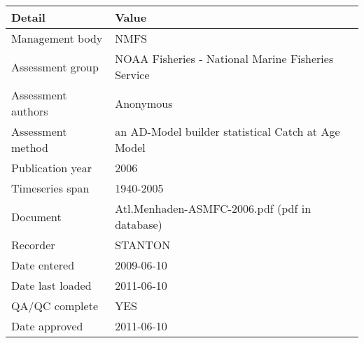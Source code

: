 \begin{table}[htb]
\centering
\begin{tabular}{lp{7cm}}
\toprule
Detail & Value \\
\midrule
Management body    & NMFS                                               \\
Assessment group   & NOAA Fisheries - National Marine Fisheries Service \\
Assessment authors & Anonymous                                          \\
Assessment method  & an AD-Model builder statistical Catch at Age Model \\
Publication year   & 2006                                               \\
Timeseries span    & 1940-2005                                          \\
Document           & Atl.Menhaden-ASMFC-2006.pdf (pdf in database)      \\
Recorder           & STANTON                                            \\
Date entered       & 2009-06-10                                         \\
Date last loaded   & 2011-06-10                                         \\
QA/QC complete     & YES                                                \\
Date approved      & 2011-06-10                                         \\
\bottomrule
\end{tabular}
\label{tab:assessdet}
\end{table}
